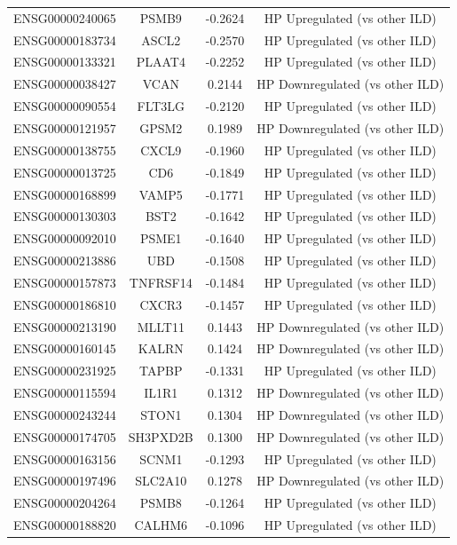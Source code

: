 \documentclass[
]{article}
\begin{document}
\begin{singlespace}
\begin{longtable}[t]{lccc}
\endfoot
\bottomrule
\endlastfoot
ENSG00000240065 & PSMB9 & -0.2624 & HP Upregulated (vs other ILD)\\
ENSG00000183734 & ASCL2 & -0.2570 & HP Upregulated (vs other ILD)\\
ENSG00000133321 & PLAAT4 & -0.2252 & HP Upregulated (vs other ILD)\\
ENSG00000038427 & VCAN & 0.2144 & HP Downregulated (vs other ILD)\\
ENSG00000090554 & FLT3LG & -0.2120 & HP Upregulated (vs other ILD)\\
\addlinespace
ENSG00000121957 & GPSM2 & 0.1989 & HP Downregulated (vs other ILD)\\
ENSG00000138755 & CXCL9 & -0.1960 & HP Upregulated (vs other ILD)\\
ENSG00000013725 & CD6 & -0.1849 & HP Upregulated (vs other ILD)\\
ENSG00000168899 & VAMP5 & -0.1771 & HP Upregulated (vs other ILD)\\
ENSG00000130303 & BST2 & -0.1642 & HP Upregulated (vs other ILD)\\
\addlinespace
ENSG00000092010 & PSME1 & -0.1640 & HP Upregulated (vs other ILD)\\
ENSG00000213886 & UBD & -0.1508 & HP Upregulated (vs other ILD)\\
ENSG00000157873 & TNFRSF14 & -0.1484 & HP Upregulated (vs other ILD)\\
ENSG00000186810 & CXCR3 & -0.1457 & HP Upregulated (vs other ILD)\\
ENSG00000213190 & MLLT11 & 0.1443 & HP Downregulated (vs other ILD)\\
\addlinespace
ENSG00000160145 & KALRN & 0.1424 & HP Downregulated (vs other ILD)\\
ENSG00000231925 & TAPBP & -0.1331 & HP Upregulated (vs other ILD)\\
ENSG00000115594 & IL1R1 & 0.1312 & HP Downregulated (vs other ILD)\\
ENSG00000243244 & STON1 & 0.1304 & HP Downregulated (vs other ILD)\\
ENSG00000174705 & SH3PXD2B & 0.1300 & HP Downregulated (vs other ILD)\\
\addlinespace
ENSG00000163156 & SCNM1 & -0.1293 & HP Upregulated (vs other ILD)\\
ENSG00000197496 & SLC2A10 & 0.1278 & HP Downregulated (vs other ILD)\\
ENSG00000204264 & PSMB8 & -0.1264 & HP Upregulated (vs other ILD)\\
ENSG00000188820 & CALHM6 & -0.1096 & HP Upregulated (vs other ILD)\\

\end{longtable}
\end{singlespace}
\end{document}
